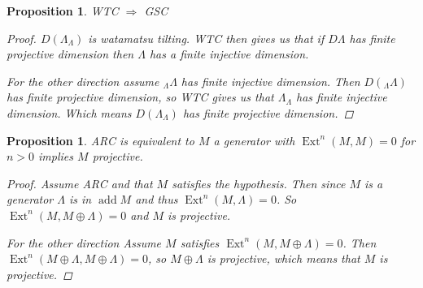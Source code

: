\documentclass[11pt, a4paper, english]{article}
\newtheorem{prop}[theorem]{Proposition}
\theoremstyle{definition}
\DeclareMathOperator{\Ext}{Ext}
\DeclareMathOperator{\add}{add}
\begin{document}
\begin{prop}WTC $\Rightarrow$ GSC
	\begin{proof}
	$D(\Lambda_\Lambda)$ is watamatsu tilting. WTC then gives us that if $D\Lambda$ has finite projective dimension then $\Lambda$ has a finite injective dimension.
	
	For the other direction assume $_\Lambda\Lambda$ has finite injective dimension. Then $D(_\Lambda\Lambda)$ has finite projective dimension, so WTC gives us that $\Lambda_\Lambda$ has finite injective dimension. Which means $D(\Lambda_\Lambda)$ has finite projective dimension.
	\end{proof}
\end{prop}

\begin{prop}
	ARC is equivalent to $M$ a generator with $\Ext^n(M, M) = 0$ for $n > 0$ implies $M$ projective.
	\begin{proof}
		Assume ARC and that $M$ satisfies the hypothesis. Then since $M$ is a generator $\Lambda$ is in $\add M$ and thus $\Ext^n(M, \Lambda)=0$. So $\Ext^n(M, M\oplus \Lambda)=0$ and $M$ is projective.
		
		For the other direction Assume $M$ satisfies $\Ext^n(M, M \oplus \Lambda)=0$. Then $\Ext^n(M \oplus \Lambda, M\oplus \Lambda) = 0$, so $M \oplus \Lambda$ is projective, which means that $M$ is projective. 
	\end{proof}
\end{prop}
\end{document}
